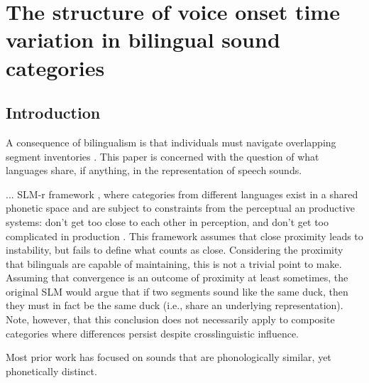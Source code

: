 \setcounter{chapter}{3}

\chapter{The structure of voice onset time variation in bilingual sound categories}

\label{Uniformity}

\section{Introduction}
A consequence of bilingualism is that individuals must navigate overlapping segment inventories \citep{flege_2021_slmr}. This paper is concerned with the question of what languages share, if anything, in the representation of speech sounds. 


... SLM-r framework \citep{flege_2021_slmr}, where categories from different languages exist in a shared phonetic space and are subject to constraints from the perceptual an productive systems: don't get too close to each other in perception, and don't get too complicated in production \citep{guion_2003_systems,lindblom_1988_universals, flege_1995_slm}. This framework assumes that close proximity leads to instability, but fails to define what counts as close. Considering the proximity that bilinguals are capable of maintaining, this is not a trivial point to make. Assuming that convergence is an outcome of proximity at least sometimes, the original SLM would argue that if two segments sound like the same duck, then they must in fact be the same duck (i.e., share an underlying representation). Note, however, that this conclusion does not necessarily apply to composite categories where differences persist despite crosslinguistic influence. %

Most prior work has focused on sounds that are phonologically similar, yet phonetically distinct.

